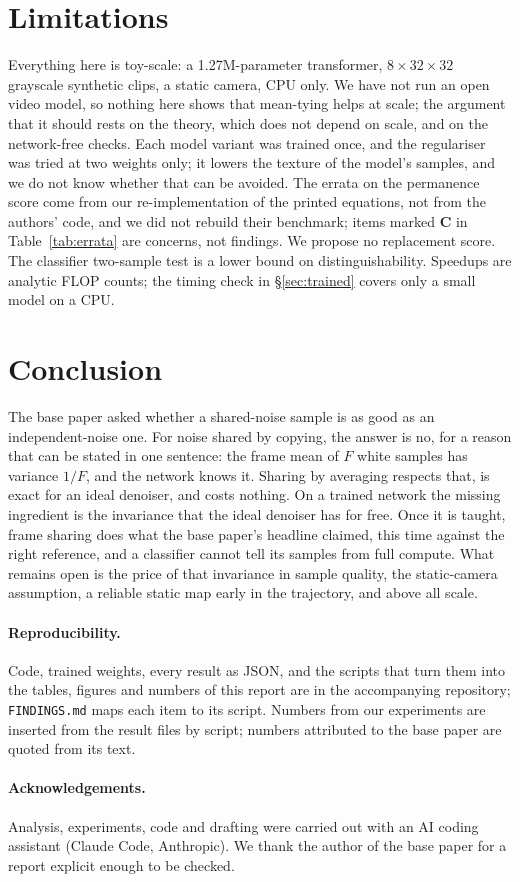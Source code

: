 \section{Limitations}
\label{sec:limits}

Everything here is toy-scale: a 1.27M-parameter transformer, $8\times32\times32$ grayscale synthetic clips, a static camera, CPU only.
We have not run an open video model, so nothing here shows that mean-tying helps at scale; the argument that it should rests on the theory, which does not depend on scale, and on the network-free checks.
Each model variant was trained once, and the regulariser was tried at two weights only; it lowers the texture of the model's samples, and we do not know whether that can be avoided.
The errata on the permanence score come from our re-implementation of the printed equations, not from the authors' code, and we did not rebuild their benchmark; items marked \textbf{C} in Table~\ref{tab:errata} are concerns, not findings.
We propose no replacement score.
The classifier two-sample test is a lower bound on distinguishability.
Speedups are analytic FLOP counts; the timing check in \S\ref{sec:trained} covers only a small model on a CPU.

\section{Conclusion}

The base paper asked whether a shared-noise sample is as good as an independent-noise one.
For noise shared by copying, the answer is no, for a reason that can be stated in one sentence: the frame mean of $F$ white samples has variance $1/F$, and the network knows it.
Sharing by averaging respects that, is exact for an ideal denoiser, and costs nothing.
On a trained network the missing ingredient is the invariance that the ideal denoiser has for free.
Once it is taught, frame sharing does what the base paper's headline claimed, this time against the right reference, and a classifier cannot tell its samples from full compute.
What remains open is the price of that invariance in sample quality, the static-camera assumption, a reliable static map early in the trajectory, and above all scale.

\paragraph{Reproducibility.}
Code, trained weights, every result as JSON, and the scripts that turn them into the tables, figures and numbers of this report are in the accompanying repository; \texttt{FINDINGS.md} maps each item to its script.
Numbers from our experiments are inserted from the result files by script; numbers attributed to the base paper are quoted from its text.

\paragraph{Acknowledgements.}
Analysis, experiments, code and drafting were carried out with an AI coding assistant (Claude Code, Anthropic).
We thank the author of the base paper for a report explicit enough to be checked.
